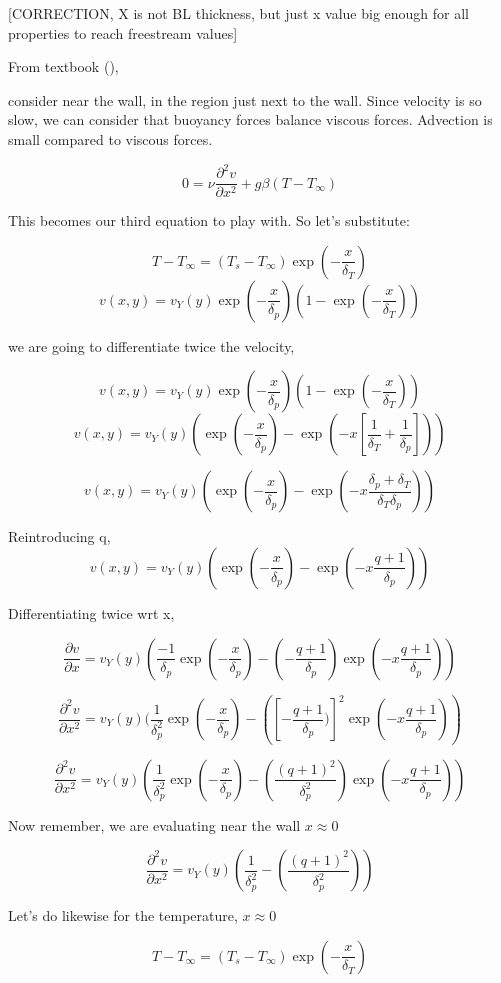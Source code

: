 \documentclass[11pt]{article}
\begin{document}
[CORRECTION, X is not BL thickness, but just x value big enough for all properties to reach freestream values]

From textbook (\cite{bejan2013convection}),

consider near the wall, in the region just next to the wall. Since velocity is so slow, we can consider that buoyancy forces balance viscous forces. Advection is small compared to viscous forces.

$$ 0 =  \nu \frac{\partial ^2 v}{\partial x^2} + g\beta (T-T_\infty)$$

This becomes our third equation to play with. So let's substitute:

$$T-T_\infty = (T_s -T_\infty) \exp (-\frac{x}{\delta_T})$$
$$v (x,y) = v_Y (y) \exp (-\frac{x}{\delta_p}) (1- \exp (-\frac{x}{\delta_T}))$$

we are going to differentiate twice the velocity,

$$v (x,y) = v_Y (y) \exp (-\frac{x}{\delta_p}) (1- \exp (-\frac{x}{\delta_T}))$$
$$v (x,y) = v_Y (y)  (\exp (-\frac{x}{\delta_p})- \exp (-x [\frac{1}{\delta_T} + \frac{1}{\delta_p}]))$$

$$v (x,y) = v_Y (y)  (\exp (-\frac{x}{\delta_p})- \exp (-x \frac{\delta_p + \delta_T}{\delta_T \delta_p} ))$$

Reintroducing q,
$$v (x,y) = v_Y (y)  (\exp (-\frac{x}{\delta_p})- \exp (-x \frac{q + 1}{ \delta_p} ))$$

Differentiating twice wrt x,

$$\frac{\partial v}{\partial x} =v_Y (y)  (\frac{-1}{\delta_p} \exp (-\frac{x}{\delta_p})- (-\frac{q + 1}{ \delta_p}) \exp (-x \frac{q + 1}{ \delta_p} )) $$

$$\frac{\partial^2 v}{\partial x^2} =v_Y (y)  (\frac{1}{\delta_p^2} \exp (-\frac{x}{\delta_p})- ([-\frac{q + 1}{ \delta_p})]^2 \exp (-x \frac{q + 1}{ \delta_p} )) $$

$$\frac{\partial^2 v}{\partial x^2} =v_Y (y)  (\frac{1}{\delta_p^2} \exp (-\frac{x}{\delta_p})- (\frac{(q + 1)^2}{ \delta_p^2}) \exp (-x \frac{q + 1}{ \delta_p} )) $$

Now remember, we are evaluating near the wall $x \approx 0$

$$\frac{\partial^2 v}{\partial x^2} =v_Y (y)  (\frac{1}{\delta_p^2} - (\frac{(q + 1)^2}{ \delta_p^2}) ) $$

Let's do likewise for the temperature, $x\approx 0$

$$T-T_\infty = (T_s -T_\infty) \exp (-\frac{x}{\delta_T})$$
\end{document}
